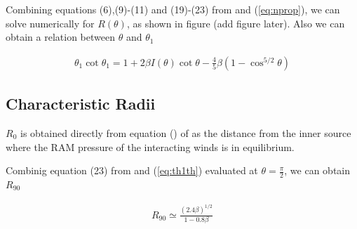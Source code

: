  Combining equations (6),(9)-(11) and (19)-(23) from \citep{Canto:1996} and (\ref{eq:nprop}), we can solve numerically for $R(\theta)$, as shown in figure (add figure later). Also we can
obtain a relation between $\theta$ and $\theta_1$

\begin{align}
\theta_1\cot\theta_1 = 1+ 2\beta I(\theta)\cot\theta - \frac{4}{5}\beta\left(1-\cos^{5/2}\theta\right)
\label{eq:th1th}
\end{align}

\subsection{Characteristic Radii}

$R_0$ is obtained directly from equation () of \citep{Canto:1996} as the distance from the inner source where the RAM pressure of the interacting winds is in equilibrium.

Combinig equation (23) from \citep{Canto:1996} and  (\ref{eq:th1th}) evaluated at $\theta=\frac{\pi}{2}$, we can obtain $R_{90}$ 

\begin{align}
R_{90} \simeq \frac{\left(2.4\beta\right)^{1/2}}{1-0.8\beta}
\label{eq:r90}
\end{align}
